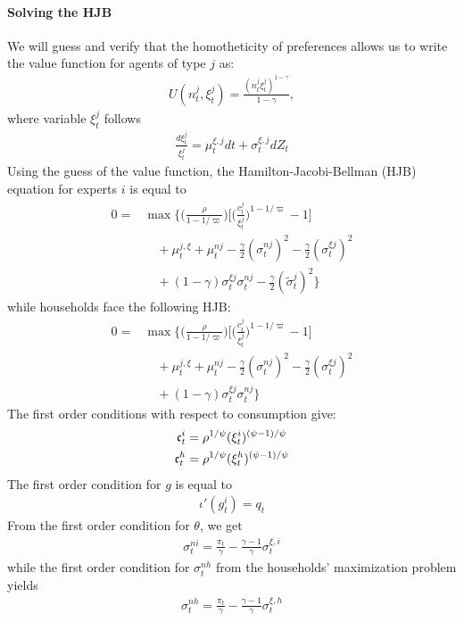 \documentclass[12pt,english]{article}
\begin{document}
\paragraph{Solving the HJB}We will guess and verify that the homotheticity of preferences allows us to write the value function for agents of type $j$ as: 
\begin{align}\label{eq:guess}
U\left(n^j_t,\xi^j_t\right) = \frac{\left(n^j_t\xi^j_t\right)^{1-\gamma}}{1-\gamma},
\end{align}
where variable $\xi^j_t$ follows 
\begin{align*}
\frac{d \xi^j_t}{\xi^j_t} = \mu^{\xi,j}_t dt + \sigma^{\xi,j}_t dZ_t
\end{align*}
Using the guess of the value function, the Hamilton-Jacobi-Bellman (HJB) equation for experts $i$ is equal to
\begin{align*}
	0 = &\max \Bigg\{ \Big(  \frac{\rho}{1-1/ \varpi} \Big) \Big[ \Big( \frac{c_t^j}{\xi_t^j} \Big)^{1-1/\varpi} - 1 \Big]\\
        &\quad+ \mu^{j,\xi}_t +  \mu_t^{nj} - \frac{\gamma}{2} (\sigma^{nj}_t )^2  - \frac{\gamma}{2} (\sigma^{\xi j}_t)^2 \\
        &\quad+ (1-\gamma) \sigma^{\xi j}_t \sigma^{nj}_t   - \frac{\gamma}{2}(\tilde{\sigma}_t^j)^2 \Bigg\}
\end{align*}
while households face the following HJB:
\begin{align*}
	0 = &\max\Bigg\{ \Big(  \frac{\rho}{1-1/ \varpi} \Big) \Big[ \Big( \frac{c_t^j}{ \xi_t^j} \Big)^{1-1/\varpi} - 1 \Big]\\
        &\quad+ \mu^{j,\xi}_t +  \mu_t^{nj} - \frac{\gamma}{2} (\sigma^{nj}_t )^2  - \frac{\gamma}{2} (\sigma^{\xi j}_t)^2 \\
        &\quad+ (1-\gamma) \sigma^{\xi j}_t \sigma^{nj}_t\Bigg\}
\end{align*}
The first order conditions with respect to consumption give:
\begin{align}
\frak{c}_t^i &= \rho^{1/\psi}(\xi_t^i)^{(\psi - 1)/\psi}\\
\frak{c}_t^h &= \rho^{1/\psi}(\xi_t^h)^{(\psi - 1)/\psi}\\
\end{align}
The first order condition for $g$ is equal to 
\begin{align}
\iota'(g_t^i) = q_t
\end{align}
From the first order condition for $\theta$, we get
\begin{align}
	\sigma_t^{ni} = \frac{\pi_t}{\gamma} - \frac{\gamma - 1}{\gamma}\sigma_t^{\xi,i}
\end{align}
while the first order condition for $\sigma_t^{nh}$ from the households' maximization problem yields
\begin{align}
	\sigma_t^{nh} = \frac{\pi_t}{\gamma} - \frac{\gamma - 1}{\gamma}\sigma_t^{\xi,h}
\end{align}
\end{document}
